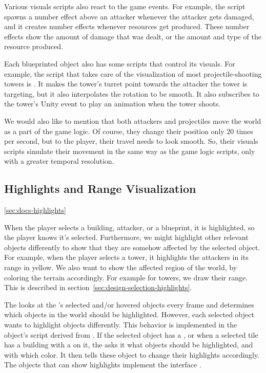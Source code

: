Various visuals scripts also react to the game events.
For example, the  script spawns a number effect above an attacker whenever the attacker gets damaged, and it creates number effects whenever resources get produced.
These number effects show the amount of damage that was dealt, or the amount and type of the resource produced.

Each blueprinted object also has some scripts that control its visuals.
For example, the script that takes care of the visualization of most projectile-shooting towers is .
It makes the tower's turret point towards the attacker the tower is targeting, but it also interpolates the rotation to be smooth.
It also subscribes to the tower's  Unity event to play an animation when the tower shoots.

We would also like to mention that both attackers and projectiles move the world as a part of the game logic.
Of course, they change their position only 20 times per second, but to the player, their travel needs to look smooth.
So, their visuals scripts simulate their movement in the same way as the game logic scripts, only with a greater temporal resolution.

\subsection{Highlights and Range Visualization}\ref{sec:docs-highlights}

When the player selects a building, attacker, or a blueprint, it is highlighted, so the player knows it's selected.
Furthermore, we might highlight other relevant objects differently to show that they are somehow affected by the selected object.
For example, when the player selects a tower, it highlights the attackers in its range in yellow.
We also want to show the affected region of the world, by coloring the terrain accordingly.
For example for towers, we draw their range.
This is described in section~\ref{sec:design-selection-highlights}.

The  looks at the 's selected and/or hovered objects every frame and determines which objects in the world should be highlighted.
However, each selected object wants to highlight objects differently.
This behavior is implemented in the object's script derived from .
If the selected object has a , or when a selected tile has a building with a  on it, the  asks it what objects should be highlighted, and with which color.
It then tells these object to change their highlights accordingly.
The objects that can show highlights implement the interface .

